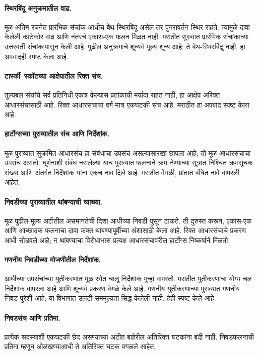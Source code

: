 \paragraph{स्थिरबिंदू अनुक्रमातील वाढ.} मूळ अंतिम रचनेत प्रारंभिक संचांक आधीच बेथ-स्थिरबिंदू असेल तर पुनरावर्तन स्थिर राहते. त्यामुळे दावा केलेली काटेकोर वाढ आणि नंतरचे एकास-एक फलन मिळत नाही. मराठीत सुरुवात प्रारंभिक संचांकाच्या उत्तरवर्ती संचांकापासून केली आहे. पुढील अनुक्रमाचे शून्यवे मूल्य शून्य आहे; ते बेथ-स्थिरबिंदू नाही, हा अपवादही स्पष्ट केला आहे.


\paragraph{टार्स्की--स्कॉटच्या आक्षेपातील रिक्त संच.} तुल्यबल संचांचे सर्व प्रतिनिधी एकत्र केल्यास प्रतांकाची मर्यादा राहत नाही, हा आक्षेप अरिक्त आधारसंचासाठी आहे. रिक्त आधारसंचाचा वर्ग मात्र एकघटकी संच आहे. मराठीत हा अपवाद स्पष्ट केला आहे.
\paragraph{हार्टोग्सच्या पुराव्यातील संच आणि निर्देशांक.} मूळ पुराव्यात सुक्रमित आधारसंच हा संबंधाचा उपसंच असल्यासारखा छापला आहे; तो मूळ आधारसंचाचा उपसंच असतो. घूर्णनाशी संबंध नसलेल्या याच पुराव्यात फलनाने क्रम नेण्याच्या सूत्रात निश्चित क्रमसूचक संख्या आणि अंतर्गत निर्देशांक यांना एकच नाव दिले आहे. मराठीत वेगळी, प्रांतात बंधित नावे वापरली आहेत.
\paragraph{निवडीच्या पुराव्यातील थांबण्याची व्याख्या.} मूळ पुढील-मूल्य अटीतील असमानतेची दिशा आधीच्या निवडी पुसून टाकते. ती दुरुस्त करून, एकास-एक आणि आच्छादक फलनाचा दावा फक्त थांबण्यापूर्वीच्या अंशासाठी केला आहे. रिक्त आधारसंचाचे प्रकरण आधी सोडवले आहे; न थांबण्याचा विरोधाभास प्रत्यक्ष आधारसंचावरील हार्टोग्स निष्कर्षाने मिळतो.
\paragraph{गणनीय निवडीच्या मोजणीतील निर्देशांक.} आधीच्या उपसंचांच्या युतीकरणात मूळ स्रोत चालू निर्देशांक पुन्हा वापरतो. मराठीत युतीकरणाचा योग्य चल निर्देशांक वापरला आहे आणि शून्यवे प्रकरण वेगळे केले आहे. गणनीय युतीकरणाच्या पुराव्यात गणनीय निवड पुरेशी आहे; या विभागात उलटी सममूल्यता सिद्ध केलेली नाही, हेही स्पष्ट केले आहे.
\paragraph{निवडसंच आणि प्रतिमा.} प्रत्येक सदस्याशी एकघटकी छेद असण्याच्या अटीत बाहेरील अतिरिक्त घटकांना बंदी नाही. निवडफलनाची प्रतिमा म्हणून ओळखण्याआधी ते अतिरिक्त घटक वगळले आहेत.
